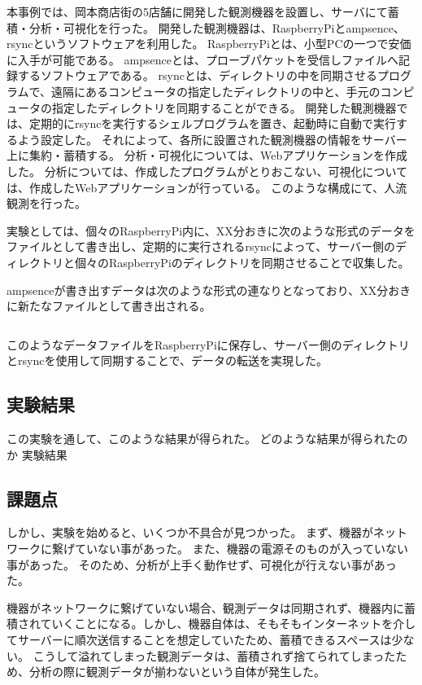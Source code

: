 本事例では、岡本商店街の5店舗に開発した観測機器を設置し、サーバにて蓄積・分析・可視化を行った。
開発した観測機器は、RaspberryPiとampsence、rsyncというソフトウェアを利用した。
RaspberryPiとは、小型PCの一つで安価に入手が可能である。
ampsenceとは、プローブパケットを受信しファイルへ記録するソフトウェアである。
rsyncとは、ディレクトリの中を同期させるプログラムで、遠隔にあるコンピュータの指定したディレクトリの中と、手元のコンピュータの指定したディレクトリを同期することができる。
開発した観測機器では、定期的にrsyncを実行するシェルプログラムを置き、起動時に自動で実行するよう設定した。
それによって、各所に設置された観測機器の情報をサーバー上に集約・蓄積する。
分析・可視化については、Webアプリケーションを作成した。
分析については、作成したプログラムがとりおこない、可視化については、作成したWebアプリケーションが行っている。
このような構成にて、人流観測を行った。

実験としては、個々のRaspberryPi内に、XX分おきに次のような形式のデータをファイルとして書き出し、定期的に実行されるrsyncによって、サーバー側のディレクトリと個々のRaspberryPiのディレクトリを同期させることで収集した。

ampsenceが書き出すデータは次のような形式の連なりとなっており、XX分おきに新たなファイルとして書き出される。
\begin{lstlisting}
\end{lstlisting}
このようなデータファイルをRaspberryPiに保存し、サーバー側のディレクトリとrsyncを使用して同期することで、データの転送を実現した。

\subsection{実験結果}
この実験を通して、このような結果が得られた。
どのような結果が得られたのか
実験結果

\subsection{課題点}

しかし、実験を始めると、いくつか不具合が見つかった。
まず、機器がネットワークに繋げていない事があった。
また、機器の電源そのものが入っていない事があった。
そのため、分析が上手く動作せず、可視化が行えない事があった。

機器がネットワークに繋げていない場合、観測データは同期されず、機器内に蓄積されていくことになる。しかし、機器自体は、そもそもインターネットを介してサーバーに順次送信することを想定していたため、蓄積できるスペースは少ない。
こうして溢れてしまった観測データは、蓄積されず捨てられてしまったため、分析の際に観測データが揃わないという自体が発生した。

